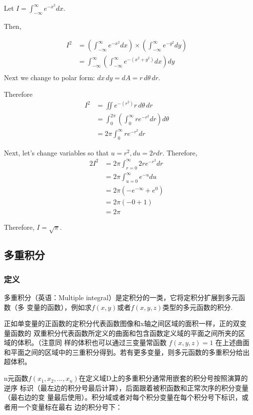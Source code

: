 \documentclass[UTF-8]{ctexart}
\begin{document}
Let $I=\int_{-\infty}^\infty e^{-x^2} dx$.

Then,

\begin{align}
I^2 &= \left(\int_{-\infty}^\infty e^{-x^2} dx\right) \times \left(\int_{-\infty}^{\infty} e^{-y^2}dy\right) \\
&=\int_{-\infty}^\infty\left(\int_{-\infty}^\infty e^{-(x^2+y^2)} dx\right)dy \\
\end{align}
Next we change to polar form: $dx\,dy=dA=r\,d\theta\,dr$.

Therefore
\begin{align}
I^2 &= \iint e^{-(r^2)}r\,d\theta\,dr \\
&=\int_0^{2\pi}\left(\int_0^\infty re^{-r^2}dr\right)d\theta \\
&=2\pi\int_0^\infty re^{-r^2}dr
\end{align}

Next, let's change variables so that $u=r^2,du=2rdr$. Therefore,
\begin{align}
2I^2 &=2\pi\int_{r=0}^\infty 2re^{-r^2}dr \\
&= 2\pi \int_{u=0}^\infty e^{-u} du \\
&= 2\pi \left(-e^{-\infty}+e^0\right) \\
&= 2\pi \left(-0+1\right) \\
&= 2\pi
\end{align}

Therefore, $I=\sqrt{\pi}$.
\subsection{多重积分}
\subsubsection{定义}
多重积分（英语：Multiple integral）是定积分的一类，它将定积分扩展到多元函数（多
变量的函数），例如求$f(x,y)$或者$f(x,y,z)$类型的多元函数的积分.

正如单变量的正函数的定积分代表函数图像和x轴之间区域的面积一样，正的双变量函数的
双重积分代表函数所定义的曲面和包含函数定义域的平面之间所夹的区域的体积。（注意同
样的体积也可以通过三变量常函数 $f(x,y,z)=1$ 在上述曲面和平面之间的区域中的三重积分得到。若有更多变量，则多元函数的多重积分给出超体积。

n元函数$f(x_1,x_2,...,x_n)$在定义域D上的多重积分通常用嵌套的积分号按照演算的逆序
标识（最左边的积分号最后计算），后面跟着被积函数和正常次序的积分变量（最右边的变
量最后使用）。积分域或者对每个积分变量在每个积分号下标识，或者用一个变量标在最右
边的积分号下：
\end{document}
